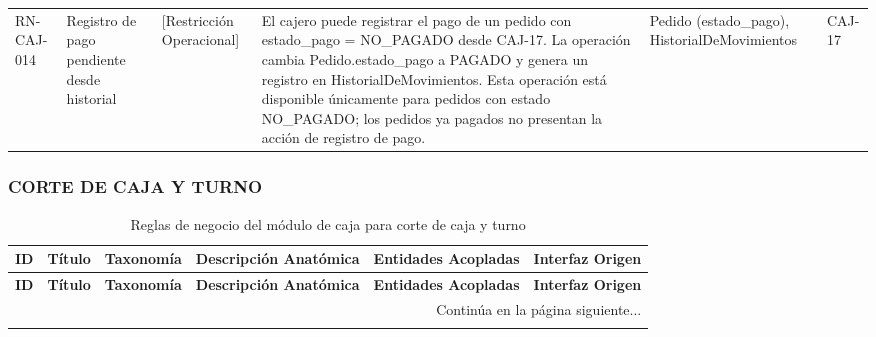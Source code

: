 \begin{landscape}
\begin{longtable}[c]{l p{2.1cm} p{2.1cm} p{8cm} p{4cm} p{3cm}}
\addlinespace
RN-CAJ-014 & Registro de pago pendiente desde historial & [Restricción Operacional] & El cajero puede registrar el pago de un pedido con estado\_pago = NO\_PAGADO desde CAJ-17. La operación cambia Pedido.estado\_pago a PAGADO y genera un registro en HistorialDeMovimientos. Esta operación está disponible únicamente para pedidos con estado NO\_PAGADO; los pedidos ya pagados no presentan la acción de registro de pago. & Pedido (estado\_pago), HistorialDeMovimientos & CAJ-17 \\
\end{longtable}
\endgroup

\subsubsection{CORTE DE CAJA Y TURNO}
\begingroup
\setlength{\LTleft}{\fill}
\setlength{\LTright}{\fill}

\begin{longtable}[c]{l p{2.1cm} p{2.1cm} p{8cm} p{4cm} p{3cm}}
\caption{Reglas de negocio del módulo de caja para corte de caja y turno} \label{tab:reglas-negocio-caja-corte-caja-turno}\\
\toprule
\textbf{ID} & \textbf{Título} & \textbf{Taxonomía} & \textbf{Descripción Anatómica} & \textbf{Entidades Acopladas} & \textbf{Interfaz Origen} \\
\midrule
\endfirsthead

\toprule
\textbf{ID} & \textbf{Título} & \textbf{Taxonomía} & \textbf{Descripción Anatómica} & \textbf{Entidades Acopladas} & \textbf{Interfaz Origen} \\
\midrule
\endhead

\midrule
\multicolumn{6}{r}{\small Continúa en la página siguiente...} \\
\endfoot
\bottomrule
\endlastfoot


\end{longtable}
\end{landscape}
